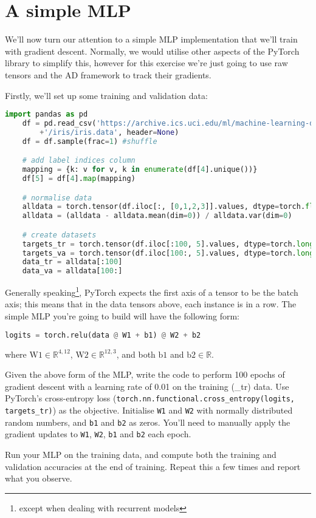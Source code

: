 \documentclass[a4paper]{article}
\begin{document}
\section{A simple MLP}\label{mlp}
We'll now turn our attention to a simple MLP implementation that we'll train with gradient descent. Normally, we would utilise other aspects of the PyTorch library to simplify this, however for this exercise we're just going to use raw tensors and the AD framework to track their gradients.

Firstly, we'll set up some training and validation data:
\begin{lstlisting}[language=Python]
	import pandas as pd
	df = pd.read_csv('https://archive.ics.uci.edu/ml/machine-learning-databases'
		+'/iris/iris.data', header=None)
	df = df.sample(frac=1) #shuffle

	# add label indices column
	mapping = {k: v for v, k in enumerate(df[4].unique())}  
	df[5] = df[4].map(mapping)

	# normalise data
	alldata = torch.tensor(df.iloc[:, [0,1,2,3]].values, dtype=torch.float)
	alldata = (alldata - alldata.mean(dim=0)) / alldata.var(dim=0)

	# create datasets
	targets_tr = torch.tensor(df.iloc[:100, 5].values, dtype=torch.long)
	targets_va = torch.tensor(df.iloc[100:, 5].values, dtype=torch.long)
	data_tr = alldata[:100]
	data_va = alldata[100:]
\end{lstlisting}

Generally speaking\footnote{except when dealing with recurrent models}, PyTorch expects the first axis of a tensor to be the batch axis; this means that in the data tensors above, each instance is in a row. The simple MLP you're going to build will have the following form:

\begin{lstlisting}[language=Python]
	logits = torch.relu(data @ W1 + b1) @ W2 + b2
\end{lstlisting}

where $\mathrm{W1} \in \mathbb{R}^{4,12}$, $\mathrm{W2} \in \mathbb{R}^{12,3}$, and both $\mathrm{b1}$ and $\mathrm{b2} \in \mathbb{R}$. 

\begin{tcolorbox}[title=2.1 Implement the MLP (1 mark)]
Given the above form of the MLP, write the code to perform 100 epochs of gradient descent with a learning rate of 0.01 on the training (\_tr) data. Use PyTorch's cross-entropy loss (\texttt{torch.nn.functional.cross\_entropy(logits, targets\_tr)}) as the objective. Initialise \texttt{W1} and \texttt{W2} with normally distributed random numbers, and \texttt{b1} and \texttt{b2} as zeros. You'll need to manually apply the gradient updates to \texttt{W1}, \texttt{W2}, \texttt{b1} and \texttt{b2} each epoch.
\end{tcolorbox}

\begin{tcolorbox}[title=2.2 Test the MLP (1 mark)]
Run your MLP on the training data, and compute both the training and validation accuracies at the end of training. Repeat this a few times and report what you observe. 
\end{tcolorbox}
\end{document}
